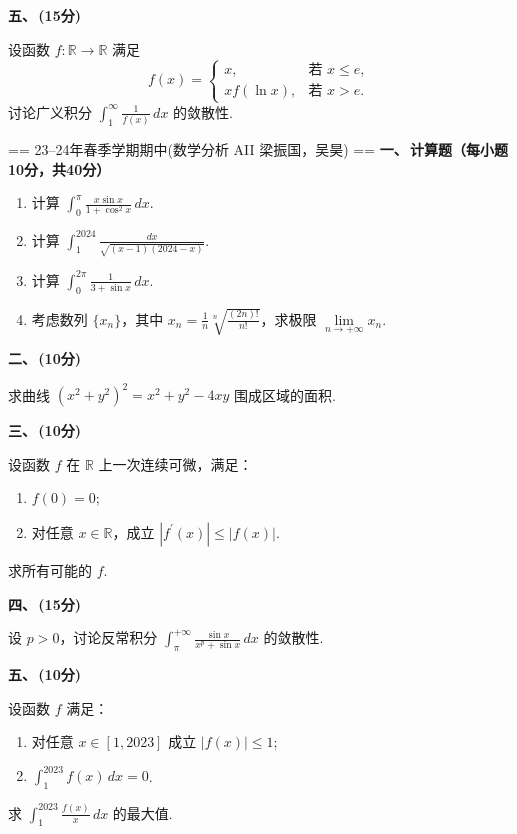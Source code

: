 \textbf{五、\,(15分)}

设函数 $f: \mathbb{R} \to \mathbb{R}$ 满足
\[
f(x)=\begin{cases}
    x, & \text{若 } x \le e, \\
    x f(\ln x), & \text{若 } x > e.
\end{cases}
\]
讨论广义积分 $\displaystyle\int_{1}^{\infty}\frac{1}{f(x)}\,dx$ 的敛散性.

== 23--24年春季学期期中(数学分析 AII 梁振国，吴昊) ==
\textbf{一、\,计算题（每小题10分，共40分）}

\begin{enumerate}
    \item 计算 $\displaystyle\int_{0}^{\pi}\frac{x \sin x}{1+\cos^{2}x}\,dx$.

    \item 计算 $\displaystyle\int_{1}^{2024}\frac{dx}{\sqrt{(x-1)(2024-x)}}$.

    \item 计算 $\displaystyle\int_{0}^{2\pi}\frac{1}{3+\sin x}\,dx$.

    \item 考虑数列 $\{x_n\}$，其中 $\displaystyle x_n = \frac{1}{n} \sqrt[n]{\frac{(2n)!}{n!}}$，求极限 $\lim\limits_{n \to +\infty} x_n$.
\end{enumerate}

\textbf{二、\,(10分)}

求曲线 $(x^{2}+y^{2})^{2}=x^{2}+y^{2}-4xy$ 围成区域的面积.

\textbf{三、\,(10分)}

设函数 $f$ 在 $\mathbb{R}$ 上一次连续可微，满足：
\begin{enumerate}
    \item[(1)] $f(0)=0$;
    \item[(2)] 对任意 $x \in \mathbb{R}$，成立 $|f^{\prime}(x)|\le|f(x)|$.
\end{enumerate}
求所有可能的 $f$.

\textbf{四、\,(15分)}

设 $p>0$，讨论反常积分 $\displaystyle\int_{\pi}^{+\infty}\frac{\sin x}{x^p + \sin x}\,dx$ 的敛散性.

\textbf{五、\,(10分)}

设函数 $f$ 满足：
\begin{enumerate}
    \item[(1)] 对任意 $x\in[1,2023]$ 成立 $|f(x)|\le1$;
    \item[(2)] $\displaystyle\int_{1}^{2023}f(x)\,dx=0$.
\end{enumerate}
求 $\displaystyle\int_{1}^{2023}\frac{f(x)}{x}\,dx$ 的最大值.

